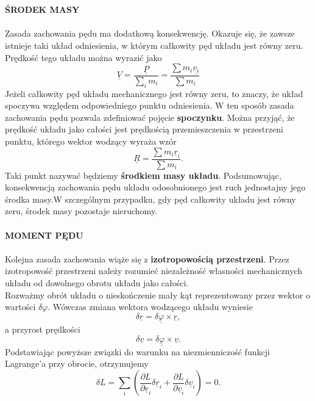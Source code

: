 \documentclass[12pt,a4paper,openright]{report} %
\begin{document}
\\
\\
\textbf{ŚRODEK MASY}\\ 
\\
Zasada zachowania pędu ma dodatkową konsekwencję. Okazuje się, że zawsze istnieje taki układ odniesienia, w którym całkowity pęd układu jest równy zeru. Prędkość tego układu można wyrazić jako
\begin{equation}
\underline{V}=\frac{\underline{P}}{\sum \limits_{i} m_i}=\frac{\sum m_i \underline{v_i}}{\sum m_i}
\end{equation} 
Jeżeli całkowity pęd układu mechanicznego jest równy zeru, to znaczy, że układ spoczywa względem odpowiedniego punktu odniesienia. W ten sposób zasada zachowania pędu pozwala zdefiniować pojęcie \textbf{spoczynku}. Można przyjąć, że prędkość układu jako całości jest prędkością przemieszczenia w przestrzeni punktu, którego wektor wodzący wyraża wzór
\begin{equation}
\underline{R}=\frac{\sum m_i \underline{r}_i}{\sum{m_i}}.
\end{equation}
Taki punkt nazywać będziemy \textbf{środkiem masy układu}. Podsumowując, konsekwencją zachowania pędu układu odosobnionego jest ruch jednostajny jego środka masy.W szczególnym przypadku, gdy pęd całkowity układu jest równy zeru, środek masy pozostaje nieruchomy.
\\
\\
\textbf{MOMENT PĘDU}\\
\\
Kolejna zasada zachowania wiąże się z \textbf{izotropowością przestrzeni}. Przez izotropowość przestrzeni należy rozumieć niezależność własności mechanicznych układu od dowolnego obrotu układu jako całości. \\
Rozważmy  obrót układu o nieskończenie mały kąt reprezentowany przez wektor o wartości $\delta \varphi$. Wówczas zmiana wektora wodzącego układu wyniesie
\begin{equation}
\delta \underline{r} = \delta \underline{\varphi} \times \underline{r},
\end{equation}
a przyrost prędkości
\begin{equation}
\delta \underline{v}=\delta \underline{\varphi} \times \underline{v}.
\end{equation}
Podstawiając powyższe związki do warunku na niezmienniczość funkcji Lagrange'a przy obrocie, otrzymujemy
\begin{equation}
\delta L = \sum \limits_{i} \left( \frac{\partial L}{\partial \underline{r}_i} \delta \underline{r}_i + \frac{\partial L}{\partial \underline{v}_i} \delta \underline{v}_i \right)=0.
\end{equation}
\end{document}
